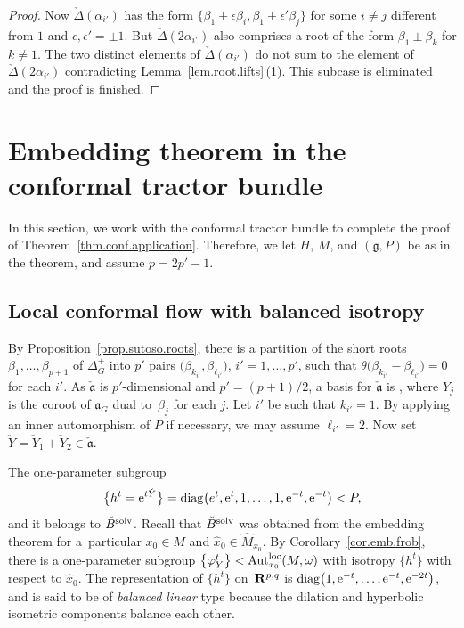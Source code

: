 \documentclass[pdftex]{sigma}
\numberwithin{equation}{section}
\theoremstyle{definition}
\newcommand{\BR}{{\bf R}}
\newcommand{\lieg}{\mathfrak{g}}
\def\a{{\mathfrak a}}
\newcommand{\Aut}{\operatorname{Aut}}
\begin{document}
\begin{proof}
Now $ \check{\Delta}(\alpha_{i'})$ has the form $\{ \beta_1 +\epsilon \beta_i, \beta_1 + \epsilon' \beta_j \}$ for some $i \neq j$ different from $1$ and $\epsilon, \epsilon' = \pm 1$. But $\check{\Delta}(2\alpha_{i'})$ also comprises a root of the form $\beta_1 \pm \beta_k$ for $k \neq 1$.
 The two distinct elements of $\check{\Delta}(\alpha_{i'})$ do not sum to the element of $\check{\Delta}(2\alpha_{i'})$
contradicting Lemma~\ref{lem.root.lifts}\,(1). This subcase is eliminated and the proof is finished.
\end{proof}

\section{Embedding theorem in the conformal tractor bundle}

In this section, we work with the conformal tractor bundle to complete the proof of Theorem~\ref{thm.conf.application}.
Therefore, we let $H$, $M$, and $(\lieg,P)$ be as in the theorem, and assume $p = 2p'-1$.

\subsection{Local conformal flow with balanced isotropy}

By Proposition~\ref{prop.sutoso.roots}, there is a partition of the short roots $\beta_1, \dots, \beta_{p+1}$ of $\Delta_G^+$ into $p'$ pairs $\bigl(\beta_{k_{i'}}, \beta_{\ell_{i'}}\bigr)$, $i' = 1, \dots, p'$, such that $\theta\bigl(\beta_{k_{i'}} - \beta_{\ell_{i'}}\bigr) = 0$ for each $i'$. As $\check{\a}$ is $p'$-dimensional and $p' = (p+1)/2$, a basis for $\check{\a}$ is , where $\check{Y}_j$ is the coroot of $\a_G$ dual to~$\beta_j$ for each $j$. Let $i'$ be such that $k_{i'} = 1$. By applying an inner automorphism of $P$ if necessary, we may assume $\ell_{i'} = 2$. Now set $\check{Y} = \check{Y}_1 + \check{Y}_2 \in \check{\a}$.

The one-parameter subgroup
\[\big\{ h^t = {\rm e}^{t \check{Y}} \big\} = {\rm diag}\bigl(e^{t}, {\rm e}^{t}, 1, \dots, 1, {\rm e}^{-t}, {\rm e}^{-t}\bigr) < P,\]
and it belongs to $\check{B}^{\rm solv}$. Recall that $\check{B}^{\rm solv}$ was obtained from the embedding theorem for a~particular $x_0 \in M$ and $\hat{x}_0 \in \hat{M}_{x_0}$. By Corollary~\ref{cor.emb.frob}, there is a one-parameter subgroup ${\bigl\{ \varphi^t_Y \bigr\} < \Aut^{\rm loc}_{x_0}(M,\omega)}$ with isotropy $\bigl\{ h^t \bigr\}$ with respect to $\hat{x}_0$.
The representation of $\bigl\{ h^t \bigr\}$ on~$\BR^{p,q}$ is ${\rm diag}\bigl(1, {\rm e}^{-t}, \dots, {\rm e}^{-t}, {\rm e}^{-2t}\bigr)$, and is said to be of \emph{balanced linear} type because the dilation and hyperbolic isometric components balance each other.
\end{document}
